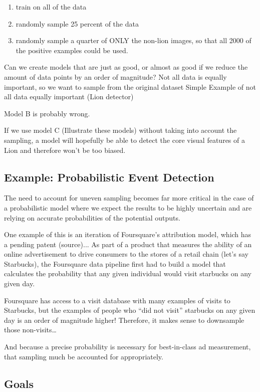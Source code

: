 \documentclass[twoside]{article}
\begin{document}
\begin{enumerate}[label=\Alph*]
\item train on all of the data
\item  randomly sample 25 percent of the data
\item  randomly sample a quarter of ONLY the non-lion images, so that all 2000 of the positive examples could be used.
\end{enumerate}


Can we create models that are just as good, or almost as good if we reduce the amount of data points by an order of magnitude?
Not all data is equally important, so we want to sample from the original dataset
Simple Example of not all data equally important (Lion detector)

Model B is probably wrong.

If we use model C (Illustrate these models) without taking into account the sampling, a model will hopefully be able to detect the core visual features of a Lion and therefore won’t be too biased.

\subsection{Example: Probabilistic Event Detection}

The need to account for uneven sampling becomes far more critical in the case of a probabilistic model where we expect the results to be highly uncertain and are relying on accurate probabilities of the potential outputs.

One example of this is an iteration of Foursquare’s attribution model, which has a pending patent (source)... As part of a product that measures the ability of an online advertisement to drive consumers to the stores of a retail chain (let’s say Starbucks), the Foursquare data pipeline first had to build a model that calculates the probability that any given individual would visit starbucks on any given day.

Foursquare has access to a visit database with many examples of visits to Starbucks, but the examples of people who “did not visit” starbucks on any given day is an order of magnitude higher! Therefore, it makes sense to downsample those non-visits…

And because a precise probability is necessary for best-in-class ad measurement, that sampling much be accounted for appropriately.

\subsection{Goals}
\end{document}
